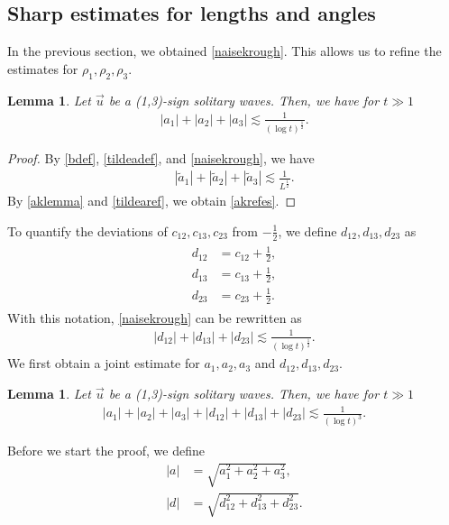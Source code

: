 \documentclass[reqno]{amsart}
\theoremstyle{plain}
\newtheorem{lemma}[theorem]{Lemma}
\theoremstyle{definition}
\numberwithin{equation}{section}
\newcommand{\1}{\mathbbm{1}}
\begin{document}
\subsection{Sharp estimates for lengths and angles}
In the previous section, we obtained \eqref{naisekrough}. This allows us to refine the estimates for $\rho_1,\rho_2,\rho_3$.
\begin{lemma}\label{rhokrefies}
Let $\vec{u}$ be a (1,3)-sign solitary waves. Then, we have for $t\gg 1$
\begin{align}\label{akrefes}
|a_1|+|a_2|+|a_3|\lesssim \frac{1}{(\log{t})^{\frac{1}{2}}}.
\end{align}
\end{lemma}
\begin{proof}
By \eqref{bdef}, \eqref{tildeadef}, and \eqref{naisekrough}, we have
\begin{align}\label{tildearef}
\left|\tilde{a}_1\right|+\left|\tilde{a}_2\right|+\left|\tilde{a}_3\right|\lesssim \frac{1}{L^{\frac{1}{2}}}.
\end{align}
By \eqref{aklemma} and \eqref{tildearef}, we obtain \eqref{akrefes}.
\end{proof}
To quantify the deviations of $c_{12},c_{13},c_{23}$ from $-\frac{1}{2}$, we define $d_{12},d_{13},d_{23}$ as
\begin{align}\label{djkdef}
\begin{aligned}
d_{12}&=c_{12}+\frac{1}{2},
\\
d_{13}&=c_{13}+\frac{1}{2},
\\
d_{23}&=c_{23}+\frac{1}{2}.
\end{aligned}
\end{align}
With this notation, \eqref{naisekrough} can be rewritten as
\begin{align}\label{djkrough}
|d_{12}|+|d_{13}|+|d_{23}|\lesssim \frac{1}{(\log{t})^{\frac{1}{2}}}.
\end{align}
We first obtain a joint estimate for $a_1,a_2,a_3$ and $d_{12},d_{13},d_{23}$.
\begin{lemma}\label{aknaiseki}
Let $\vec{u}$ be a (1,3)-sign solitary waves. Then, we have for $t\gg 1$
\begin{align}\label{kituiakdjkes}
|a_1|+|a_2|+|a_3|+|d_{12}|+|d_{13}|+|d_{23}|\lesssim \frac{1}{(\log{t})^3}.
\end{align}
\end{lemma}
Before we start the proof, we define
\begin{align*}
|a|&=\sqrt{a_1^2+a_2^2+a_3^2},
\\
|d|&=\sqrt{d_{12}^2+d_{13}^2+d_{23}^2}.
\end{align*}
\end{document}
